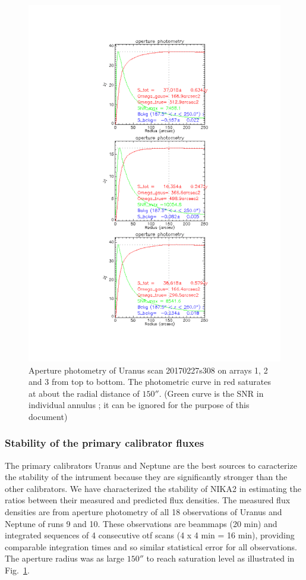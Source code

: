\begin{figure}[p]
\begin{center}
  \includegraphics[clip, angle=0, scale=0.7]{Figures/Uranus_s308.pdf}
  \caption{Aperture photometry of Uranus  scan 20170227s308  on arrays 1, 2 and 3 from top to bottom.
    The photometric curve in red saturates at about the radial
    distance of  $150''$. (Green curve is the SNR in individual
    annulus ; it can be ignored for the purpose of this document)}
\label{fig:PhAp}
\end{center}
\end{figure}


\subsubsection{Stability of the primary calibrator fluxes}

The primary calibrators Uranus and Neptune are the best sources to caracterize the stability of the intrument
because they are significantly stronger than the other calibrators.
We have characterized the stability of NIKA2  in estimating the ratios between their measured 
and predicted flux densities. The measured flux densities are from aperture photometry of all
18 observations  of Uranus and Neptune of runs 9 and 10. These observations are   beammaps  (20 min) and integrated sequences of 
4 consecutive otf scans  (4 x 4 min = 16 min), providing  comparable integration times and so similar statistical error for all observations.
The aperture radius was as large $150''$ to reach saturation level
as illustrated in Fig.~\ref{fig:PhAp}. 

